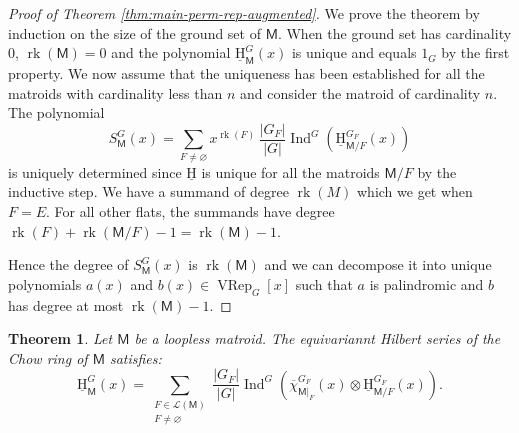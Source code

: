 \documentclass[11pt, a4paper, english]{amsart}
\theoremstyle{teoremas}
\newtheorem{theorem}{Theorem}[section]
\theoremstyle{definition}
\DeclareMathOperator{\rk}{rk}
\newcommand{\M}{\mathsf{M}}
\newcommand{\uH}{\underline{\mathrm{H}}}
\newcommand{\VRep}{\operatorname{VRep}}
\newcommand{\Ind}{\operatorname{Ind}}
\begin{document}
\begin{proof}[Proof of Theorem \ref{thm:main-perm-rep-augmented}]
    We prove the theorem by induction on the size of the ground set of $\M$. When
    the ground set has cardinality 0, $\rk(\M)=0$ and the polynomial $\uH_{\M}^G(x)$ is unique
    and equals $1_G$ by the first property. We now assume that the uniqueness has been established
    for all the matroids with cardinality less than $n$ and consider the matroid of cardinality
    $n$. The polynomial
    \[S_\M^G(x) = \sum_{F\neq\varnothing}x^{\rk(F)}\,\frac{|G_{F}|}{|G|}\Ind^G\left(\uH_{\M/F}^{G_F}(x)
    \right)\]
    is uniquely determined since $\uH$ is unique for all the matroids $\M/F$ by the inductive
    step. We have a summand of degree $\rk(M)$ which we get when $F=E$. For all other flats, the
    summands have degree $\rk(F)+\rk(\M/F)-1=\rk(\M)-1$.

    Hence the degree of $S_\M^G(x)$ is $\rk(\M)$ and we can decompose it into unique polynomials
    $a(x)$ and $b(x)\in\VRep_G[x]$ such that $a$ is palindromic and $b$ has degree at most
    $\rk(\M)-1$.
\end{proof}
\begin{theorem}\label{thm:equiv-main-part2}
    Let $\M$ be a loopless matroid. The equivariannt Hilbert series of the Chow ring of $\M$ satisfies:
        \[ \uH_{\M}^G(x) = \sum_{\substack{F\in\mathcal{L}(\M)\\ F\neq\varnothing}} \frac{|G_F|}{|G|}\Ind^G\left(\overline{\chi}_{\M|_F}^{G_F}(x)\otimes \uH_{\M/F}^{G_F}(x)\right).\]
\end{theorem}
\end{document}
